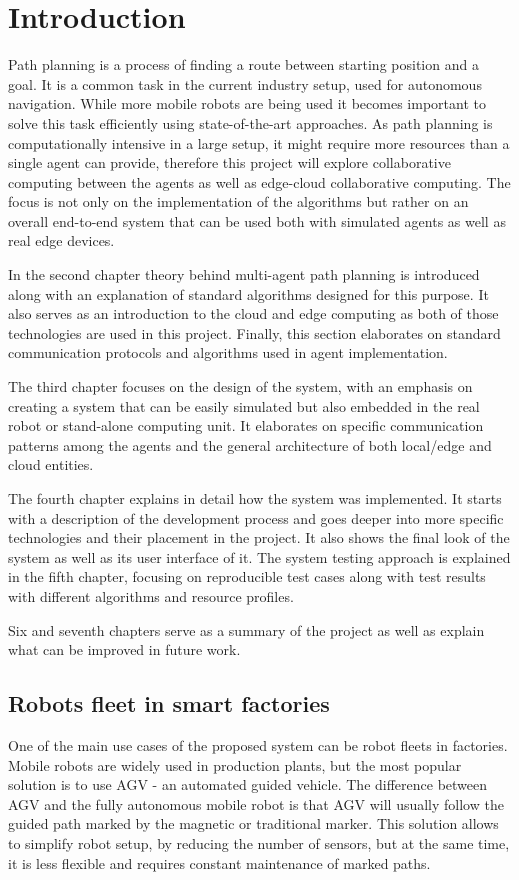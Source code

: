\chapter{Introduction}

Path planning is a process of finding a route between starting position and a goal. It is a common task in the current industry setup, used for autonomous navigation. While more mobile robots are being used it becomes important to solve this task efficiently using state-of-the-art approaches. As path planning is computationally intensive in a large setup, it might require more resources than a single agent can provide, therefore this project will explore collaborative computing between the agents as well as edge-cloud collaborative computing. The focus is not only on the implementation of the algorithms but rather on an overall end-to-end system that can be used both with simulated agents as well as real edge devices.

In the second chapter theory behind multi-agent path planning is introduced along with an explanation of standard algorithms designed for this purpose. It also serves as an introduction to the cloud and edge computing as both of those technologies are used in this project. Finally, this section elaborates on standard communication protocols and algorithms used in agent implementation.

The third chapter focuses on the design of the system, with an emphasis on creating a system that can be easily simulated but also embedded in the real robot or stand-alone computing unit. It elaborates on specific communication patterns among the agents and the general architecture of both local/edge and cloud entities.

The fourth chapter explains in detail how the system was implemented. It starts with a description of the development process and goes deeper into more specific technologies and their placement in the project. It also shows the final look of the system as well as its user interface of it. The system testing approach is explained in the fifth chapter, focusing on reproducible test cases along with test results with different algorithms and resource profiles.

Six and  seventh chapters serve as a summary of the project as well as explain what can be improved in future work.

\section{Robots fleet in smart factories}
One of the main use cases of the proposed system can be robot fleets in factories. Mobile robots are widely used in production plants, but the most popular solution is to use AGV - an automated guided vehicle\cite{agv}. The difference between AGV and the fully autonomous mobile robot is that AGV will usually follow the guided path marked by the magnetic or traditional marker. This solution allows to simplify robot setup, by reducing the number of sensors, but at the same time, it is less flexible and requires constant maintenance of marked paths.

